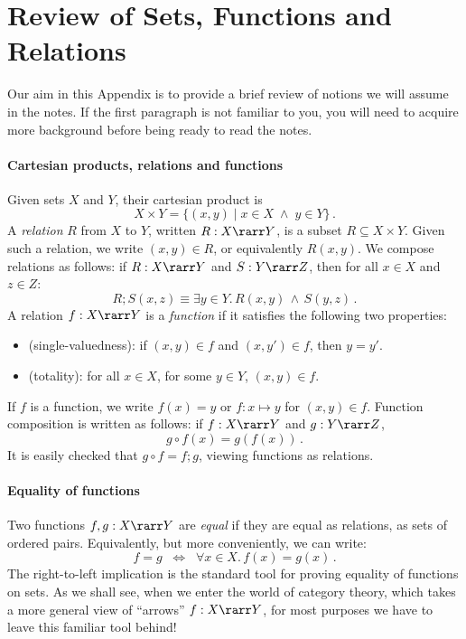 \documentclass{svmult}
\begin{document}

\appendix

\section{Review of Sets, Functions and Relations}
Our aim in this Appendix is to provide a brief review of notions we will assume in the notes. If the first paragraph is not familiar to you, you  will need to acquire more background before being ready to read the notes.

\paragraph{Cartesian products, relations and functions}
Given sets $X$ and $Y$, their cartesian product is
\[ X \times Y = \{ (x, y) \mid x \in X \; \wedge \; y \in Y \} \, . \]
A \emph{relation} $R$ from $X$ to $Y$, written $R : X \rarr Y$, is a subset $R \subseteq X \times Y$. Given such a relation, we write $(x, y) \in R$, or equivalently $R(x, y)$. We  compose relations as follows: if $R : X \rarr Y$ and $S : Y \rarr Z$, then for all $x \in X$ and $z \in Z$:
\[ R; S (x, z) \equiv \exists y \in Y. \, R(x,y) \, \wedge \, S(y,z) \, . \]
A relation $f : X \rarr Y$ is a \emph{function} if it satisfies the following two properties:
\begin{itemize}
\item (single-valuedness): if  $(x, y) \in f$ and $(x, y') \in f$, then $y = y'$.
\item (totality): for all $x \in X$, for some $y \in Y$, $(x, y) \in f$.
\end{itemize}
If $f$ is  a function, we write $f(x) = y$ or $f: x \mapsto y$ for $(x, y) \in f$. Function composition is written as follows: if $f : X \rarr Y$ and $g : Y \rarr Z$,
\[ g \circ f (x) = g(f(x)) \, . \]
It is easily checked that $g \circ f = f;g$, viewing functions as relations.

\paragraph{Equality of functions}
Two functions $f, g : X \rarr Y$ are \emph{equal} if they are equal as relations, \ie as sets of ordered pairs. Equivalently, but more conveniently, we can write:
\[ f = g \;\; \Longleftrightarrow \;\; \forall x \in X. \, f(x) = g(x) \, . \]
The right-to-left implication is the standard tool for proving equality of functions on sets. As we shall see, when we enter the world of category theory, which takes a more general view of ``arrows'' $f : X \rarr Y$, for most purposes we have to leave this familiar tool behind!
\end{document}
